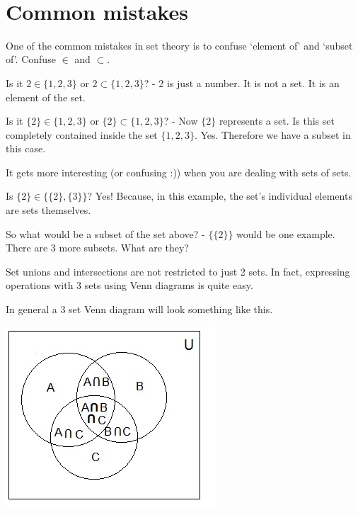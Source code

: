 \documentclass[12pt]{article}
\begin{document}
\begin{center}
\\
\vspace{1cm}
\end{center}


\medskip\noindent
	

\vspace{0.5cm}\noindent

\section*{Common mistakes}

One of the common mistakes in set theory is to confuse `element of' and `subset of'. Confuse $\in$ and $\subset$.

Is it $2 \in \{1,2,3\}$ or $2 \subset \{1,2,3\}$? - 2 is just a number. It is not a set. It is an element of the set.

Is it $\{2\} \in \{1,2,3\}$ or $\{2\} \subset \{1,2,3\}$? - Now $\{2\}$ represents a set. Is this set completely contained inside the set $\{1,2,3\}$. Yes. Therefore we have a subset in this case.

It gets more interesting (or confusing :)) when you are dealing with sets of sets.

Is $\{2\} \in \{\{2\},\{3\}\}$? Yes! Because, in this example, the set's individual elements are sets themselves.

So what would be a subset of the set above? - $\{\{2\}\}$ would be one example. There are 3 more subsets. What are they?


Set unions and intersections are not restricted to just 2 sets. In fact, expressing operations with 3 sets using Venn diagrams is quite easy.

In general a 3 set Venn diagram will look something like this.

\includegraphics{3setsVenn.png}
\end{document}
